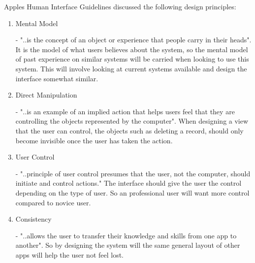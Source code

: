 Apples Human Interface Guidelines \cite{guidelines} discussed the following design principles:

\begin{enumerate}
  \item Mental Model 
  
  - "..is the concept of an object or experience that people carry in their heads". It is the model of what users believes about the system, so the mental model of past experience on similar systems will be carried when looking to use this system. This will involve looking at current systems available and design the interface somewhat similar.
  
  \item Direct Manipulation
  
  - "..is an example of an implied action that helps users feel that they are controlling the objects represented by the computer". When designing a view that the user can control, the objects such as deleting a record, should only become invisible once the user has taken the action.
  
  \item User Control 
  
  - "..principle of user control presumes that the user, not the computer, should initiate and control actions." The interface should give the user the control depending on the type of user. So an professional user will want more control compared to novice user.
  
  \item Consistency
  
  - "..allows the user to transfer their knowledge and skills from one app to another". So by designing the system will the same general layout of other apps will help the user not feel lost.
  
\end{enumerate}